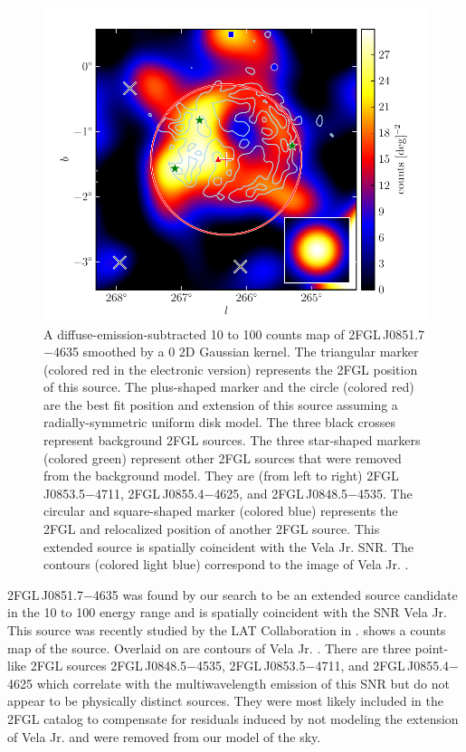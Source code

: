 \begin{figure}[htbp]
  \includegraphics{chapters/extended_search/figures/source_plots/source_Vela_Jr_color.pdf}
  \caption{A diffuse-emission-subtracted 10 \gev to 100 \gev counts map
  of 2FGL\,J0851.7$-$4635 smoothed by a 0 2D Gaussian kernel. The
  triangular marker (colored red in the electronic version) represents the
  2FGL position of this source.  The plus-shaped marker and the circle
  (colored red) are the best fit position and extension of this source
  assuming a radially-symmetric uniform disk model.  The three black
  crosses represent background 2FGL sources.  The three star-shaped
  markers (colored green) represent other 2FGL sources that were
  removed from the background model.  They are (from left to right)
  2FGL\,J0853.5$-$4711, 2FGL\,J0855.4$-$4625, and 2FGL\,J0848.5$-$4535.
  The circular and square-shaped marker (colored blue) represents the
  2FGL and relocalized position of another 2FGL source.  This extended
  source is spatially coincident with the Vela Jr. SNR.  The contours
  (colored light blue) correspond to the \tev image of Vela Jr.
  \citep{aharonian_2007a_h.e.s.s.-observations}.}
\end{figure}

2FGL\,J0851.7$-$4635 was found by our search to be an extended source
candidate in the 10 \gev to 100 \gev energy range and is spatially
coincident with the SNR Vela Jr. This source was recently studied by
the LAT Collaboration in \cite{tanaka_2011a_gamma-ray-observations}.
 shows a counts map of the source.
Overlaid on  are \tev contours of Vela
Jr. \citep{aharonian_2007a_h.e.s.s.-observations}.  There are three
point-like 2FGL sources 2FGL\,J0848.5$-$4535, 2FGL\,J0853.5$-$4711, and
2FGL\,J0855.4$-$4625 which correlate with the multiwavelength emission of
this SNR but do not appear to be physically distinct sources.  They were
most likely included in the 2FGL catalog to compensate for residuals
induced by not modeling the extension of Vela Jr. and were removed from
our model of the sky.

